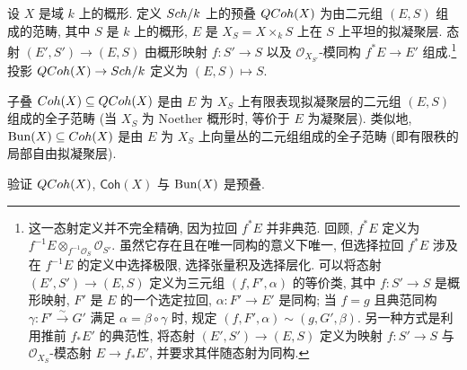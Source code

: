 \begin{example}[凝聚层与向量丛的预叠]\label{src:3.4.12}
设 $X$ 是域 $k$ 上的概形. 定义 $Sch/k$ 上的预叠 $QCoh(X)$ 为由二元组 $(E,S)$ 组成的范畴, 其中 $S$ 是 $k$ 上的概形, $E$ 是 $X_S=X\times_k S$ 上在 $S$ 上平坦的拟凝聚层. 态射 $(E',S')\to(E,S)$ 由概形映射 $f:S'\to S$ 以及 $\mathcal O_{X_{S'}}$-模同构 $f^*E\to E'$ 组成.\footnote{这一态射定义并不完全精确, 因为拉回 $f^*E$ 并非典范. 回顾, $f^*E$ 定义为 $f^{-1}E\otimes_{f^{-1}\mathcal O_S}\mathcal O_{S'}$. 虽然它存在且在唯一同构的意义下唯一, 但选择拉回 $f^*E$ 涉及在 $f^{-1}E$ 的定义中选择极限, 选择张量积及选择层化. 可以将态射 $(E',S')\to(E,S)$ 定义为三元组 $(f,F',\alpha)$ 的等价类, 其中 $f:S'\to S$ 是概形映射, $F'$ 是 $E$ 的一个选定拉回, $\alpha:F'\to E'$ 是同构; 当 $f=g$ 且典范同构 $\gamma:F'\xrightarrow{\sim}G'$ 满足 $\alpha=\beta\circ\gamma$ 时, 规定 $(f,F',\alpha)\sim(g,G',\beta)$. 另一种方式是利用推前 $f_*E'$ 的典范性, 将态射 $(E',S')\to(E,S)$ 定义为映射 $f:S'\to S$ 与 $\mathcal O_{X_S}$-模态射 $E\to f_*E'$, 并要求其伴随态射为同构.}
投影 $QCoh(X)\to Sch/k$ 定义为 $(E,S)\mapsto S$.

子叠 $Coh(X)\subseteq QCoh(X)$ 是由 $E$ 为 $X_S$ 上有限表现拟凝聚层的二元组 $(E,S)$ 组成的全子范畴 (当 $X_S$ 为 Noether 概形时, 等价于 $E$ 为凝聚层). 类似地, $\operatorname{Bun}(X)\subseteq Coh(X)$ 是由 $E$ 为 $X_S$ 上向量丛的二元组组成的全子范畴 (即有限秩的局部自由拟凝聚层).
\end{example}
\begin{exercise}\label{src:3.4.13}
验证 $QCoh(X)$, $\mathsf{Coh}(X)$ 与 $\operatorname{Bun}(X)$ 是预叠.
\end{exercise}

